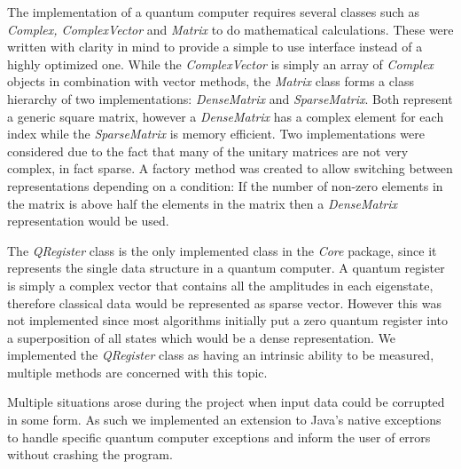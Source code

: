 The implementation of a quantum computer requires several classes such as \emph{Complex, ComplexVector} and \emph{Matrix} to do mathematical calculations. These were written with clarity in mind to provide a simple to use interface instead of a highly optimized one. While the \emph{ComplexVector} is simply an array of \emph{Complex} objects in combination with vector methods, the \emph{Matrix} class forms a class hierarchy of two implementations: \emph{DenseMatrix} and \emph{SparseMatrix}. Both represent a generic square matrix, however a \emph{DenseMatrix} has a complex element for each index while the \emph{SparseMatrix} is memory efficient. Two implementations were considered due to the fact that many of the unitary matrices are not very complex, in fact sparse. A factory method was created to allow switching between representations depending on a condition: If the number of non-zero elements in the matrix is above half the elements in the matrix then a \emph{DenseMatrix} representation would be used.


The \emph{QRegister} class is the only implemented class in the \emph{Core} package, since it represents the single data structure in a quantum computer. A quantum register is simply a complex vector that contains all the amplitudes in each eigenstate, therefore classical data would be represented as sparse vector. However this was not implemented since most algorithms initially put a zero quantum register into a superposition of all states which would be a dense representation. We implemented the \emph{QRegister} class as having an intrinsic ability to be measured, multiple methods are concerned with this topic.

Multiple situations arose during the project when input data could be corrupted in some form. As such we implemented an extension to Java's native exceptions to handle specific quantum computer exceptions and inform the user of errors without crashing the program.